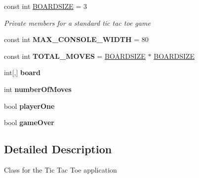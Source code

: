 \begin{DoxyCompactItemize}
\item 
const int \hyperlink{class_tic_tac_toe_1_1_tic_tac_toe_a25127e54bb6afd2fef9f9b4f5d9f35b0}{B\+O\+A\+R\+D\+S\+I\+Z\+E} = 3
\begin{DoxyCompactList}\small\item\em Private members for a standard tic tac toe game \end{DoxyCompactList}\item 
\hypertarget{class_tic_tac_toe_1_1_tic_tac_toe_ac535e95f10c14c05626a01fff25c6afc}{}const int {\bfseries M\+A\+X\+\_\+\+C\+O\+N\+S\+O\+L\+E\+\_\+\+W\+I\+D\+T\+H} = 80\label{class_tic_tac_toe_1_1_tic_tac_toe_ac535e95f10c14c05626a01fff25c6afc}

\item 
\hypertarget{class_tic_tac_toe_1_1_tic_tac_toe_a608eb727a4de9d13af78b663a39322b6}{}const int {\bfseries T\+O\+T\+A\+L\+\_\+\+M\+O\+V\+E\+S} = \hyperlink{class_tic_tac_toe_1_1_tic_tac_toe_a25127e54bb6afd2fef9f9b4f5d9f35b0}{B\+O\+A\+R\+D\+S\+I\+Z\+E} $\ast$ \hyperlink{class_tic_tac_toe_1_1_tic_tac_toe_a25127e54bb6afd2fef9f9b4f5d9f35b0}{B\+O\+A\+R\+D\+S\+I\+Z\+E}\label{class_tic_tac_toe_1_1_tic_tac_toe_a608eb727a4de9d13af78b663a39322b6}

\item 
\hypertarget{class_tic_tac_toe_1_1_tic_tac_toe_a950bd34d4c07d3a33b3d172788e2bc59}{}int\mbox{[},\mbox{]} {\bfseries board}\label{class_tic_tac_toe_1_1_tic_tac_toe_a950bd34d4c07d3a33b3d172788e2bc59}

\item 
\hypertarget{class_tic_tac_toe_1_1_tic_tac_toe_aca4efe700de5dbda413d90face7fe831}{}int {\bfseries number\+Of\+Moves}\label{class_tic_tac_toe_1_1_tic_tac_toe_aca4efe700de5dbda413d90face7fe831}

\item 
\hypertarget{class_tic_tac_toe_1_1_tic_tac_toe_a5612d5cd165dd358b41c4fc3729e2917}{}bool {\bfseries player\+One}\label{class_tic_tac_toe_1_1_tic_tac_toe_a5612d5cd165dd358b41c4fc3729e2917}

\item 
\hypertarget{class_tic_tac_toe_1_1_tic_tac_toe_a4b2605e85ca3408fbcb9324e8d3a591b}{}bool {\bfseries game\+Over}\label{class_tic_tac_toe_1_1_tic_tac_toe_a4b2605e85ca3408fbcb9324e8d3a591b}

\end{DoxyCompactItemize}


\subsection{Detailed Description}
Class for the Tic Tac Toe application 



